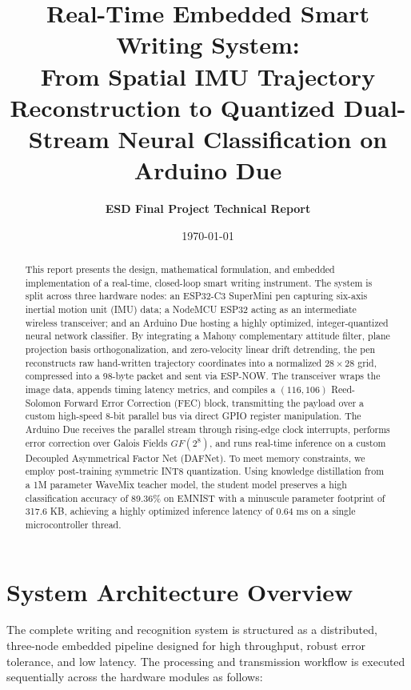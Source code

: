 \documentclass[12pt,a4paper]{article}
\title{\textbf{Real-Time Embedded Smart Writing System:}\\From Spatial IMU Trajectory Reconstruction to Quantized Dual-Stream Neural Classification on Arduino Due}
\author{\textbf{ESD Final Project Technical Report}}
\date{\today}
\begin{document}
\maketitle

\begin{abstract}
    This report presents the design, mathematical formulation, and embedded implementation of a real-time, closed-loop smart writing instrument. The system is split across three hardware nodes: an ESP32-C3 SuperMini pen capturing six-axis inertial motion unit (IMU) data; a NodeMCU ESP32 acting as an intermediate wireless transceiver; and an Arduino Due hosting a highly optimized, integer-quantized neural network classifier. 
    By integrating a Mahony complementary attitude filter, plane projection basis orthogonalization, and zero-velocity linear drift detrending, the pen reconstructs raw hand-written trajectory coordinates into a normalized $28 \times 28$ grid, compressed into a 98-byte packet and sent via ESP-NOW. 
    The transceiver wraps the image data, appends timing latency metrics, and compiles a $(116, 106)$ Reed-Solomon Forward Error Correction (FEC) block, transmitting the payload over a custom high-speed 8-bit parallel bus via direct GPIO register manipulation. 
    The Arduino Due receives the parallel stream through rising-edge clock interrupts, performs error correction over Galois Fields $GF(2^8)$, and runs real-time inference on a custom Decoupled Asymmetrical Factor Net (DAFNet). 
    To meet memory constraints, we employ post-training symmetric INT8 quantization. Using knowledge distillation from a 1M parameter WaveMix teacher model, the student model preserves a high classification accuracy of 89.36\% on EMNIST with a minuscule parameter footprint of 317.6 KB, achieving a highly optimized inference latency of 0.64 ms on a single microcontroller thread.
\end{abstract}

\newpage
\tableofcontents
\newpage

\section{System Architecture Overview}
The complete writing and recognition system is structured as a distributed, three-node embedded pipeline designed for high throughput, robust error tolerance, and low latency. The processing and transmission workflow is executed sequentially across the hardware modules as follows:
\end{document}
